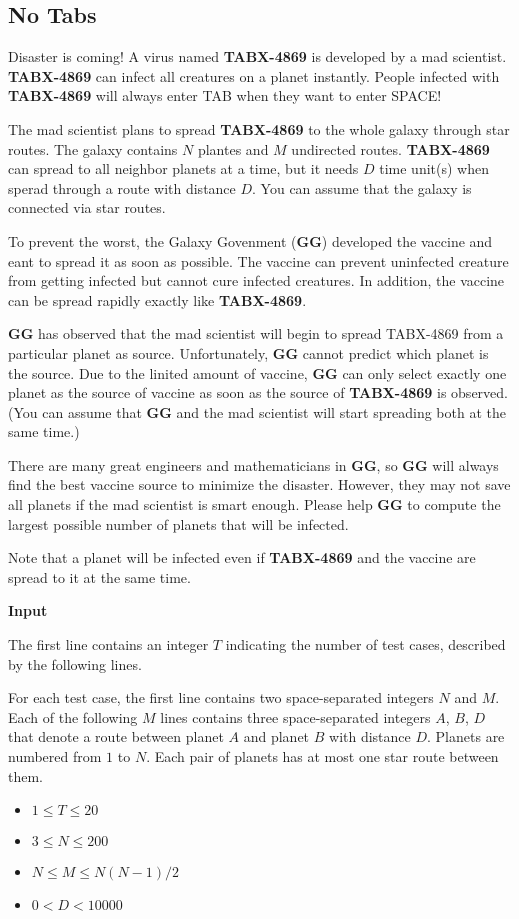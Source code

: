 \subsection{No Tabs}
Disaster is coming! A virus named \textbf{TABX-4869} is developed by a mad scientist. \textbf{TABX-4869} can infect all creatures on a planet instantly. People infected with \textbf{TABX-4869} will always enter TAB when they want to enter SPACE!

The mad scientist plans to spread \textbf{TABX-4869} to the whole galaxy through star routes. The galaxy contains $N$ plantes and $M$ undirected routes. \textbf{TABX-4869} can spread to all neighbor planets at a time, but it needs $D$ time unit(s) when sperad through a route with distance $D$. You can assume that the galaxy is connected via star routes.

To prevent the worst, the Galaxy Govenment (\textbf{GG}) developed the vaccine and eant to spread it as soon as possible. The vaccine can prevent uninfected creature from getting infected but cannot cure infected creatures. In addition, the vaccine can be spread rapidly exactly like \textbf{TABX-4869}.

\textbf{GG} has observed that the mad scientist will begin to spread TABX-4869 from a particular planet as source. Unfortunately, \textbf{GG} cannot predict which planet is the source. Due to the linited amount of vaccine, \textbf{GG} can only select exactly one planet as the source of vaccine as soon as the source of \textbf{TABX-4869} is observed. (You can assume that \textbf{GG} and the mad scientist will start spreading both at the same time.)

There are many great engineers and mathematicians in \textbf{GG}, so \textbf{GG} will always find the best vaccine source to minimize the disaster. However, they may not save all planets if the mad scientist is smart enough. Please help \textbf{GG} to compute the largest possible number of planets that will be infected.

Note that a planet will be infected even if \textbf{TABX-4869} and the vaccine are spread to it at the same time.

\begin{flushleft}
{\color{red} \textbf{Input}}
\end{flushleft}
The first line contains an integer $T$ indicating the number of test cases, described by the following lines.

For each test case, the first line contains two space-separated integers $N$ and $M$. Each of the following $M$ lines contains three space-separated integers $A$, $B$, $D$ that denote a route between planet $A$ and planet $B$ with distance $D$. Planets are numbered from $1$ to $N$. Each pair of planets has at most one star route between them.
\begin{itemize}
\item $1 \leq T \leq 20$
\item $3 \leq N \leq 200$
\item $N \leq M \leq N(N-1)/2$
\item $0 < D < 10000$
\end{itemize}


